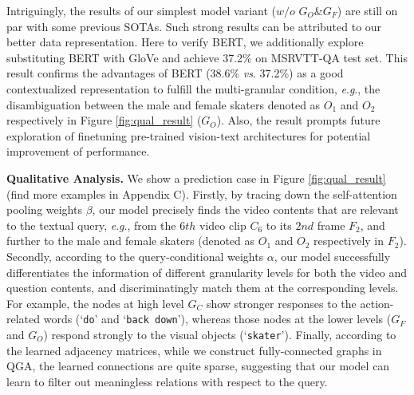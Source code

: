 \documentclass[letterpaper]{article} \usepackage{aaai21}  \usepackage{times}  \usepackage{helvet} \usepackage{courier}  \usepackage[hyphens]{url}  \usepackage{graphicx} \urlstyle{rm} \def\UrlFont{\rm}  \usepackage{natbib}  \usepackage{caption} \usepackage{color, colortbl}
\newcommand{\vs}{\textit{vs}. }
\newcommand{\eg}{\textit{e}.\textit{g}.}
\begin{document}
Intriguingly, the results of our simplest model variant ($w/o$ $G_O\&G_F$) are still on par with some previous SOTAs. Such strong results can be attributed to our better data representation. Here to verify BERT, we additionally explore substituting BERT with GloVe \cite{pennington2014glove} and achieve 37.2\% on MSRVTT-QA test set. This result confirms the advantages of BERT (38.6\% \vs 37.2\%) as a good contextualized representation to fulfill the multi-granular condition, \eg, the disambiguation between the male and female skaters denoted as $O_1$ and $O_2$ respectively in Figure  \ref{fig:qual_result} ($G_O$). Also, the result prompts future exploration of finetuning pre-trained vision-text architectures \cite{lei2021less} for potential improvement of performance.

\setlength{\tabcolsep}{2.6pt}
\begin{table}[t!]
\small
\centering
\begin{threeparttable}
\caption{Test accuracy per question type. Roughly $\frac{1}{2}$ ($\frac{1}{3}$) of the `what' questions in MSRVTT-QA (MSVD-QA) ask actions/activities; others are about objects/attributes. We distinguish them via the pattern `what ... doing' in questions.}
\label{table:detailres}
\end{threeparttable}
\vspace{-1em} 
\end{table}

\textbf{Qualitative Analysis.}
We show a prediction case in Figure \ref{fig:qual_result} (find more examples in Appendix C). Firstly, by tracing down the self-attention pooling weights $\beta$, our model precisely finds the video contents that are relevant to the textual query, \eg, from the $6th$ video clip $C_6$ to its $2nd$ frame $F_2$, and further to the male and female skaters (denoted as $O_1$ and $O_2$ respectively in $F_2$). Secondly, according to the query-conditional weights $\alpha$, our model successfully differentiates the information of different granularity levels for both the video and question contents, and discriminatingly match them at the corresponding levels. For example, the nodes at high level $G_C$ show stronger responses to the action-related words (`\texttt{do}' and `\texttt{back down}'), whereas those nodes at the lower levels ($G_F$ and $G_O$) respond strongly to the visual objects (`\texttt{skater}'). Finally, according to the learned adjacency matrices,  while we construct fully-connected graphs in QGA, the learned connections are quite sparse, suggesting that our model can learn to filter out meaningless relations with respect to the query. 
\end{document}
